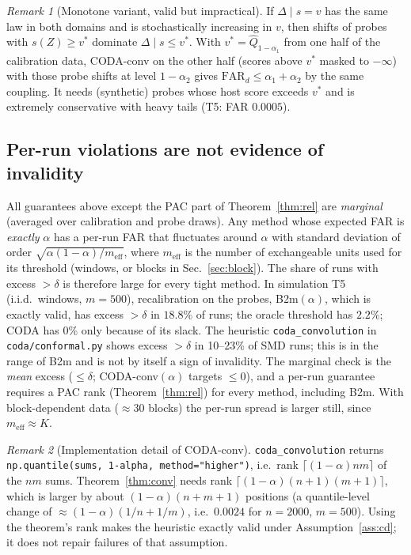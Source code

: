 \documentclass[conference]{IEEEtran}
\theoremstyle{definition}
\theoremstyle{remark}
\newtheorem{remark}{Remark}
\newcommand{\Q}{\widehat Q}
\newcommand{\FAR}{\mathrm{FAR}}
\begin{document}
\begin{remark}[Monotone variant, valid but impractical]
If $\Delta\mid s=v$ has the same law in both domains and is stochastically increasing in $v$, then shifts of probes with $s(Z)\ge v^*$ dominate $\Delta\mid s\le v^*$. With $v^*=\Q_{1-\alpha_1}$ from one half of the calibration data, CODA-conv on the other half (scores above $v^*$ masked to $-\infty$) with those probe shifts at level $1-\alpha_2$ gives $\FAR_d\le\alpha_1+\alpha_2$ by the same coupling. It needs (synthetic) probes whose host score exceeds $v^*$ and is extremely conservative with heavy tails (T5: FAR $0.0005$).
\end{remark}


\subsection{Per-run violations are not evidence of invalidity}\label{sec:viol}
All guarantees above except the PAC part of Theorem~\ref{thm:rel} are \emph{marginal} (averaged over calibration and probe draws). Any method whose expected FAR is \emph{exactly} $\alpha$ has a per-run FAR that fluctuates around $\alpha$ with standard deviation of order $\sqrt{\alpha(1-\alpha)/m_{\mathrm{eff}}}$, where $m_{\mathrm{eff}}$ is the number of exchangeable units used for its threshold (windows, or blocks in Sec.~\ref{sec:block}). The share of runs with excess $>\delta$ is therefore large for every tight method. In simulation T5 (i.i.d.\ windows, $m=500$), recalibration on the probes, B2m$(\alpha)$, which is exactly valid, has excess $>\delta$ in $18.8\%$ of runs; the oracle threshold has $2.2\%$; CODA has $0\%$ only because of its slack. The heuristic \texttt{coda\_convolution} in \texttt{coda/conformal.py} shows excess $>\delta$ in 10--23\% of SMD runs; this is in the range of B2m and is not by itself a sign of invalidity. The marginal check is the \emph{mean} excess ($\le\delta$; CODA-conv$(\alpha)$ targets $\le 0$), and a per-run guarantee requires a PAC rank (Theorem~\ref{thm:rel}) for every method, including B2m. With block-dependent data ($\approx30$ blocks) the per-run spread is larger still, since $m_{\mathrm{eff}}\approx K$.

\begin{remark}[Implementation detail of CODA-conv]
\texttt{coda\_convolution} returns \texttt{np.quantile(sums, 1-alpha, method="higher")}, i.e.\ rank $\lceil(1-\alpha)nm\rceil$ of the $nm$ sums. Theorem~\ref{thm:conv} needs rank $\lceil(1-\alpha)(n+1)(m+1)\rceil$, which is larger by about $(1-\alpha)(n+m+1)$ positions (a quantile-level change of $\approx(1-\alpha)(1/n+1/m)$, i.e.\ $0.0024$ for $n=2000$, $m=500$). Using the theorem's rank makes the heuristic exactly valid under Assumption~\ref{ass:cd}; it does not repair failures of that assumption.
\end{remark}
\end{document}
